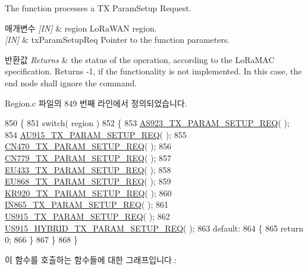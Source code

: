 The function processes a TX Param\+Setup Request. 


\begin{DoxyParams}{매개변수}
{\em \mbox{[}\+I\+N\mbox{]}} & region Lo\+Ra\+W\+AN region.\\
\hline
{\em \mbox{[}\+I\+N\mbox{]}} & tx\+Param\+Setup\+Req Pointer to the function parameters.\\
\hline
\end{DoxyParams}

\begin{DoxyRetVals}{반환값}
{\em Returns} & the status of the operation, according to the Lo\+Ra\+M\+AC specification. Returns -\/1, if the functionality is not implemented. In this case, the end node shall ignore the command. \\
\hline
\end{DoxyRetVals}


Region.\+c 파일의 849 번째 라인에서 정의되었습니다.


\begin{DoxyCode}
850 \{
851     \textcolor{keywordflow}{switch}( region )
852     \{
853         \mbox{\hyperlink{_region_8c_a7e69cebe76337b430beefe81ea2f2778}{AS923\_TX\_PARAM\_SETUP\_REQ}}( );
854         \mbox{\hyperlink{_region_8c_a3ac80629bb68f70ad073c2569d002a1c}{AU915\_TX\_PARAM\_SETUP\_REQ}}( );
855         \mbox{\hyperlink{_region_8c_a55cde63ba4973860df75664a1cbb0406}{CN470\_TX\_PARAM\_SETUP\_REQ}}( );
856         \mbox{\hyperlink{_region_8c_a664fcbc639c1c0282bbe2349ba3aad95}{CN779\_TX\_PARAM\_SETUP\_REQ}}( );
857         \mbox{\hyperlink{_region_8c_a2c9f9a96f6d4b3d82a694968e7c87186}{EU433\_TX\_PARAM\_SETUP\_REQ}}( );
858         \mbox{\hyperlink{_region_8c_ab6b9ba65d37c4c42b237be9164bd132f}{EU868\_TX\_PARAM\_SETUP\_REQ}}( );
859         \mbox{\hyperlink{_region_8c_aa1a13ce3344e2b0d1e6be559a4883117}{KR920\_TX\_PARAM\_SETUP\_REQ}}( );
860         \mbox{\hyperlink{_region_8c_a3ec5334722e47fb210be229138c2139f}{IN865\_TX\_PARAM\_SETUP\_REQ}}( );
861         \mbox{\hyperlink{_region_8c_a79860a403e84c63becffb70f5e6bf1e7}{US915\_TX\_PARAM\_SETUP\_REQ}}( );
862         \mbox{\hyperlink{_region_8c_a1713663f298ebc23a96d768a88c8c1f2}{US915\_HYBRID\_TX\_PARAM\_SETUP\_REQ}}( );
863         \textcolor{keywordflow}{default}:
864         \{
865             \textcolor{keywordflow}{return} 0;
866         \}
867     \}
868 \}
\end{DoxyCode}
이 함수를 호출하는 함수들에 대한 그래프입니다.\+:
\mbox{\label{group___r_e_g_i_o_n_ga7c1ff626bc1131889fa8de3197a1093a}} 
